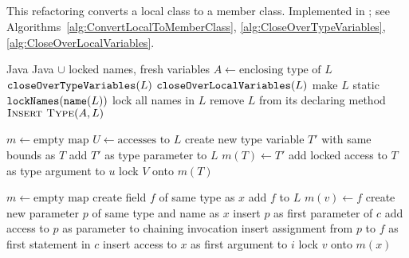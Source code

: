 \subsection{}
This refactoring converts a local class to a member class. Implemented in ; see Algorithms~\ref{alg:ConvertLocalToMemberClass}, \ref{alg:CloseOverTypeVariables}, \ref{alg:CloseOverLocalVariables}.

\begin{algorithm}
\caption{$\refactoring{Convert Local to Member Class}(L : \type{LocalClass}) : \type{MemberType}$}\label{alg:ConvertLocalToMemberClass}
\begin{algorithmic}[1]
\REQUIRE Java
\ENSURE Java $\cup$ locked names, fresh variables
\medskip
\STATE $A \leftarrow \text{enclosing type of $L$}$
\STATE $\text{\texttt{closeOverTypeVariables}}(L)$
\STATE $\text{\texttt{closeOverLocalVariables}}(L)$
  \STATE make $L$ static
\ENDIF
\STATE $\text{\texttt{lockNames}}(\text{\texttt{name}}(L))$
\STATE lock all names in $L$
\STATE remove $L$ from its declaring method
\STATE $\textsc{Insert Type}(A, L)$
\end{algorithmic}
\end{algorithm}

\begin{algorithm}
\caption{$\util{closeOverTypeVariables}(L : \type{LocalClass})$}\label{alg:CloseOverTypeVariables}
\begin{algorithmic}[1]
\medskip
\STATE $m \leftarrow \text{empty map}$
\STATE $U \leftarrow \text{accesses to $L$}$
    \STATE create new type variable $T'$ with same bounds as $T$
    \STATE add $T'$ as type parameter to $L$
    \STATE $m(T) \leftarrow T'$
      \STATE add locked access to $T$ as type argument to $u$
    \ENDFOR
  \ENDIF
  \STATE lock $V$ onto $m(T)$
\ENDFOR
\end{algorithmic}
\end{algorithm}

\begin{algorithm}
\caption{$\util{closeOverLocalVariables}(L : \type{LocalClass})$}\label{alg:CloseOverLocalVariables}
\begin{algorithmic}[1]
\medskip
\STATE $m \leftarrow \text{empty map}$
    \STATE create  field $f$ of same type as $x$
    \STATE add $f$ to $L$
    \STATE $m(v) \leftarrow f$
      \STATE create new parameter $p$ of same type and name as $x$
      \STATE insert $p$ as first parameter of $c$
        \STATE add access to $p$ as parameter to chaining invocation
      \ELSE
        \STATE insert assignment from $p$ to $f$ as first statement in $c$
      \ENDIF
    \ENDFOR
      \STATE insert access to $x$ as first argument to $i$
    \ENDFOR
  \ENDIF
  \STATE lock $v$ onto $m(x)$
\ENDFOR
\end{algorithmic}
\end{algorithm}

